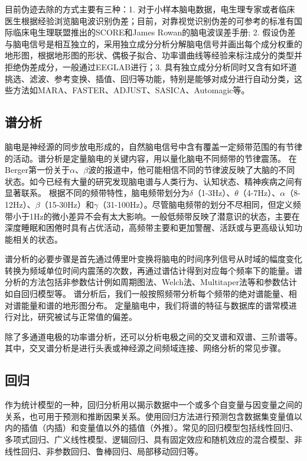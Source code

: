 目前伪迹去除的方式主要有三种：1. 对于小样本脑电数据，电生理专家或者临床医生根据经验浏览脑电波识别伪差；目前，对靠视觉识别伪差的可参考的标准有国际临床电生理联盟推出的SCORE和James Rowan的脑电波误差手册; 2. 假设伪差与脑电信号是相互独立的，采用独立成分分析分解脑电信号并画出每个成分权重的地形图，根据地形图的形状、偶极子拟合、功率谱曲线等经验来标注成分的类型并拒绝伪差成分，一般通过EEGLAB进行；3. 具有独立成分分析同时又含有如坏道挑选、滤波、参考变换、插值、回归等功能，特别是能够对成分进行自动分类，这些方法如MARA、FASTER、ADJUST、SASICA、Automagic等。

\subsection{谱分析}
脑电是神经源的同步放电形成的，自然脑电信号中含有覆盖一定频带范围的有节律的活动。谱分析是定量脑电的关键内容，用以量化脑电不同频带的节律震荡。 在Berger第一份关于$\alpha$、$\beta$波的报道中，他可能相信不同的节律波反映了大脑的不同状态。如今已经有大量的研究发现脑电谱与人类行为、认知状态、精神疾病之间有显著联系。 根据不同的频带特性，脑电频带划分为$\delta$（1-3Hz）、$\theta$（4-7Hz）、$\alpha$（8-12Hz）、$\beta$（15-30Hz）和$\gamma$（31-100Hz）。尽管脑电频带的划分不尽相同，但定义频带小于1Hz的微小差异不会有太大影响。一般低频带反映了潜意识的状态，主要在深度睡眠和困倦时具有占优活动，高频带主要和更加警醒、活跃或与更高级认知功能相关的状态。

谱分析的必要步骤是首先通过傅里叶变换将脑电的时间序列信号从时域的幅度变化转换为频域单位时间内震荡的次数，再通过谱估计得到对应每个频率下的能量。谱分析的方法包括非参数估计例如周期图法、Welch法、Multitaper法等和参数估计如自回归模型等。 谱分析后，我们一般按照频带分析每个频带的绝对谱能量、相对谱能量和谱的地形图分布。 定量脑电中，我们将谱的特征与数据库的谱常模进行对比，研究被试与正常值的偏差。

除了多通道电极的功率谱分析，还可以分析电极之间的交叉谱和双谱、三阶谱等。 其中，交叉谱分析是进行头表或神经源之间频域连接、网络分析的常见步骤。

\subsection{回归}
作为统计模型的一种，回归分析用以揭示数据中一个或多个自变量与因变量之间的关系，也可用于预测和推断因果关系。使用回归方法进行预测包含数据集变量值以内的插值（内插）和变量值以外的插值（外推）。常见的回归模型包括线性回归、多项式回归、广义线性模型、逻辑回归、具有固定效应和随机效应的混合模型、非线性回归、非参数回归、鲁棒回归、局部移动回归等。

